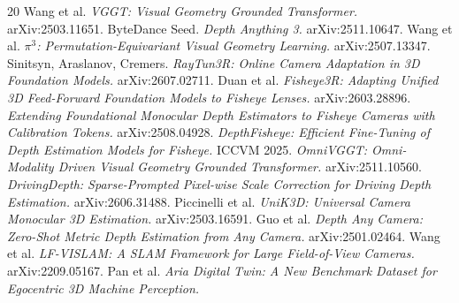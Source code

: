 \documentclass{article}
\begin{document}
\begin{thebibliography}{20}
 Wang et al. \emph{VGGT: Visual Geometry Grounded Transformer.} arXiv:2503.11651.
 ByteDance Seed. \emph{Depth Anything 3.} arXiv:2511.10647.
 Wang et al. \emph{$\pi^3$: Permutation-Equivariant Visual Geometry Learning.} arXiv:2507.13347.
 Sinitsyn, Araslanov, Cremers. \emph{RayTun3R: Online Camera Adaptation in 3D Foundation Models.} arXiv:2607.02711.
 Duan et al. \emph{Fisheye3R: Adapting Unified 3D Feed-Forward Foundation Models to Fisheye Lenses.} arXiv:2603.28896.
 \emph{Extending Foundational Monocular Depth Estimators to Fisheye Cameras with Calibration Tokens.} arXiv:2508.04928.
 \emph{DepthFisheye: Efficient Fine-Tuning of Depth Estimation Models for Fisheye.} ICCVM 2025. %
 \emph{OmniVGGT: Omni-Modality Driven Visual Geometry Grounded Transformer.} arXiv:2511.10560.
 \emph{DrivingDepth: Sparse-Prompted Pixel-wise Scale Correction for Driving Depth Estimation.} arXiv:2606.31488. %
 Piccinelli et al. \emph{UniK3D: Universal Camera Monocular 3D Estimation.} arXiv:2503.16591.
 Guo et al. \emph{Depth Any Camera: Zero-Shot Metric Depth Estimation from Any Camera.} arXiv:2501.02464.
 Wang et al. \emph{LF-VISLAM: A SLAM Framework for Large Field-of-View Cameras.} arXiv:2209.05167.
 Pan et al. \emph{Aria Digital Twin: A New Benchmark Dataset for Egocentric 3D Machine Perception.} %
\end{thebibliography}
\end{document}
